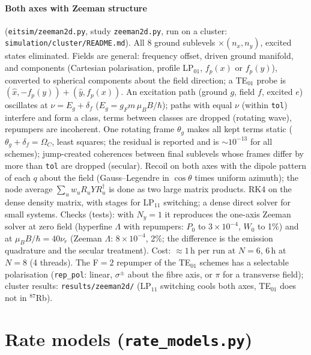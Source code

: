 \documentclass[11pt,a4paper]{article}
\newcommand{\code}[1]{\texttt{#1}}
\begin{document}
\paragraph{Both axes with Zeeman structure} (\code{eitsim/zeeman2d.py}, study \code{zeeman2d.py}, run on a cluster: \code{simulation/cluster/README.md}). All 8 ground sublevels $\times(n_x,n_y)$, excited states eliminated. Fields are general: frequency offset, driven ground manifold, and components (Cartesian polarisation, profile LP$_{01}$, $f_p(x)$ or $f_p(y)$), converted to spherical components about the field direction; a TE$_{01}$ probe is $(\hat x,-f_p(y))+(\hat y,f_p(x))$. An excitation path (ground $g$, field $f$, excited $e$) oscillates at $\nu=E_g+\delta_f$ ($E_g=g_Fm\,\mu_BB/\hbar$); paths with equal $\nu$ (within \code{tol}) interfere and form a class, terms between classes are dropped (rotating wave), repumpers are incoherent. One rotating frame $\theta_g$ makes all kept terms static ($\theta_g+\delta_f=\Omega_C$, least squares; the residual is reported and is $\sim10^{-13}$ for all schemes); jump-created coherences between final sublevels whose frames differ by more than \code{tol} are dropped (secular). Recoil on both axes with the dipole pattern of each $q$ about the field (Gauss--Legendre in $\cos\theta$ times uniform azimuth); the node average $\sum_uw_uR_uYR_u^\dagger$ is done as two large matrix products. RK4 on the dense density matrix, with stages for LP$_{11}$ switching; a dense direct solver for small systems. Checks (tests): with $N_y=1$ it reproduces the one-axis Zeeman solver at zero field (hyperfine $\Lambda$ with repumpers: $P_0$ to $3\times10^{-4}$, $W_0$ to 1\%) and at $\mu_BB/\hbar=40\nu_r$ (Zeeman $\Lambda$: $8\times10^{-4}$, 2\%; the difference is the emission quadrature and the secular treatment). Cost: $\approx1$\,h per run at $N=6$, 6\,h at $N=8$ (4 threads). The F$=2$ repumper of the TE$_{01}$ schemes has a selectable polarisation (\code{rep\_pol}: linear, $\sigma^\pm$ about the fibre axis, or $\pi$ for a transverse field); cluster results: \code{results/zeeman2d/} (LP$_{11}$ switching cools both axes, TE$_{01}$ does not in $^{87}$Rb).

\section{Rate models (\code{rate\_models.py})}
\label{sec:rates}
\end{document}
